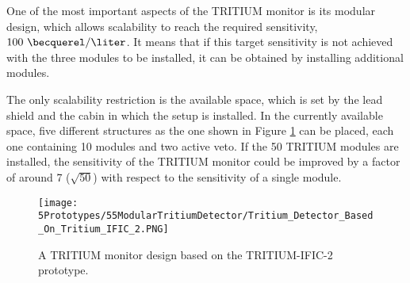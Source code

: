 One of the most important aspects of the TRITIUM monitor is its modular design, which allows scalability to reach the required sensitivity, $100~\becquerel/\liter$. It means that if this target sensitivity is not achieved with the three modules to be installed, it can be obtained by installing additional modules.

The only scalability restriction is the available space, which is set by the lead shield and the cabin in which the setup is installed. In the currently available space, five different structures as the one shown in Figure \ref{fig:TritiumMonitorIFIC2Design} can be placed, each one containing 10 modules and two active veto. If the 50 TRITIUM modules are installed, the sensitivity of the TRITIUM monitor could be improved by a factor of around 7 ($\sqrt{50}$) with respect to the sensitivity of a single module.

\begin{figure}[h]
\centering
\texttt{[image: 5Prototypes/55ModularTritiumDetector/Tritium\_Detector\_Based\_On\_Tritium\_IFIC\_2.PNG]}
\caption{A TRITIUM monitor design based on the TRITIUM-IFIC-2 prototype.\label{fig:TritiumMonitorIFIC2Design}}
\end{figure}